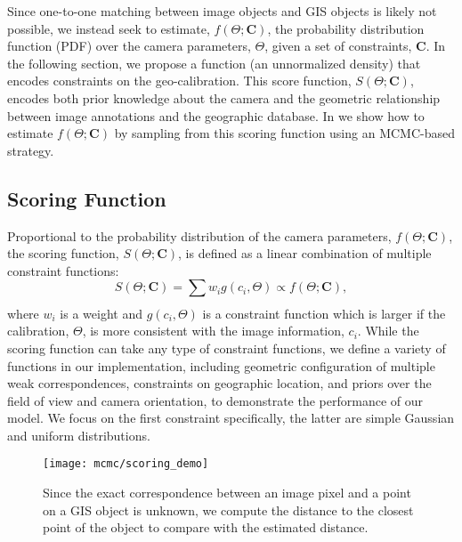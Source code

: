 Since one-to-one matching between image objects and GIS objects is
likely not possible, we instead seek to estimate, $f(\Theta;
\mathbf{C})$, the probability distribution function (PDF) over the
camera parameters, $\Theta$, given a set of constraints, $\mathbf{C}$.
In the following section, we propose a function (an unnormalized
density) that encodes constraints on the geo-calibration.  This score
function, $S(\Theta; \mathbf{C})$, encodes both prior knowledge about
the camera and the geometric relationship between image annotations
and the geographic database.
%
In  we show how to estimate $f(\Theta;\mathbf{C})$ by
sampling from this scoring function using an MCMC-based strategy.

\subsection{Scoring Function}
\label{sec:scoring-function}

Proportional to the probability distribution of the camera parameters,
$f(\Theta; \mathbf{C})$, the scoring function, $S(\Theta;
\mathbf{C})$, is defined as a linear combination of multiple constraint
functions:
%
\begin{equation}
  S(\Theta; \mathbf{C}) = \sum_{}{w_i g(c_i, \Theta)} \propto
  f(\Theta; \mathbf{C}),
\end{equation}
%
where $w_i$ is a weight and $g(c_i, \Theta)$ is a constraint function
which is larger if the calibration, $\Theta$, is more consistent with
the image information, $c_i$. 
%
While the scoring function can take any type of constraint functions,
we define a variety of functions in our implementation, including
geometric configuration of multiple weak correspondences, constraints
on geographic location, and priors over the field of view and camera
orientation, to demonstrate the performance of our model. 
%
%
We focus on the first constraint specifically, the latter are simple
Gaussian and uniform distributions. 

\begin{figure}
\begin{minipage}[b]{1\linewidth}
  \centering
  \centerline{\texttt{[image: mcmc/scoring\_demo]}}
\end{minipage}
\caption{Since the exact correspondence between an image pixel and a point
  on a GIS object is unknown, we compute the distance to the closest
  point of the object to compare with the estimated distance.}
\label{fig:scoring-demo}
\end{figure}


